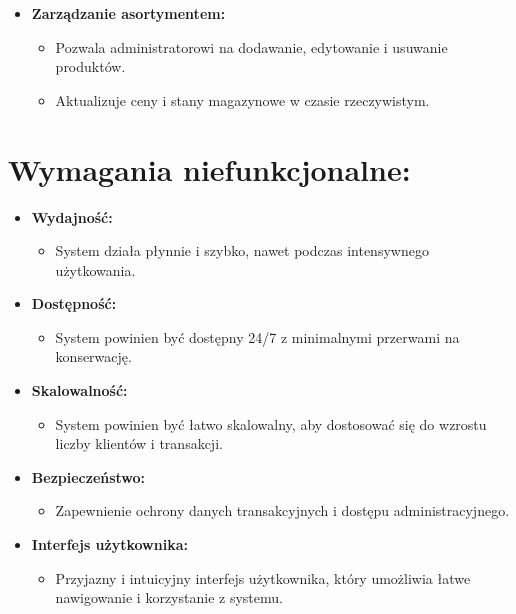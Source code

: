 \begin{itemize}
    \item \textbf{Zarządzanie asortymentem:}
    \begin{itemize}  
        \item Pozwala administratorowi na dodawanie, edytowanie i usuwanie produktów.
        \item Aktualizuje ceny i stany magazynowe w czasie rzeczywistym.
    \end{itemize}
\end{itemize}

\newpage

\section{Wymagania niefunkcjonalne:}
\begin{itemize}
    \item \textbf{Wydajność:}
    \begin{itemize}
        \item System działa płynnie i szybko, nawet podczas intensywnego użytkowania.    
    \end{itemize}

    
    \item \textbf{Dostępność:}
    \begin{itemize}
        \item System powinien być dostępny 24/7 z minimalnymi przerwami na konserwację.
    \end{itemize}


    
    \item \textbf{Skalowalność:}
    \begin{itemize}
        \item System powinien być łatwo skalowalny, aby dostosować się do wzrostu liczby klientów i transakcji.
    \end{itemize}
    
    \item \textbf{Bezpieczeństwo:}
    \begin{itemize}
        \item Zapewnienie ochrony danych transakcyjnych i dostępu administracyjnego.
    \end{itemize}
    
    \item \textbf{Interfejs użytkownika:}
    \begin{itemize}
        \item Przyjazny i intuicyjny interfejs użytkownika, który umożliwia łatwe nawigowanie i korzystanie z systemu.
    \end{itemize}
    

\end{itemize}
